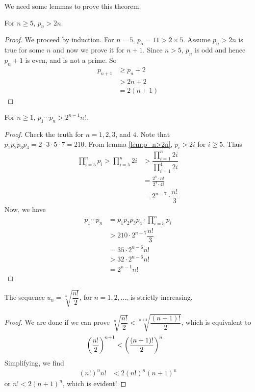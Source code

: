 \documentclass{subfiles}
\begin{document}
	We need some lemmas to prove this theorem.

	\begin{lemma}
		For $n\geq 5$, $p_n>2n$.\label{lem:p_n>2n}
	\end{lemma}

	\begin{proof}
		We proceed by induction. For $n=5$, $p_5=11>2 \times 5$. Assume $p_n >2n$ is true for some $n$ and now we prove it for $n+1$. Since $n>5$, $p_n$ is odd and hence $p_n+1$ is even, and is not a prime. So
			\begin{align*}
				p_{n+1}
					& \geq p_n+2\\
					& >2n+2\\
					& =2(n+1)
			\end{align*}
	\end{proof}

	\begin{lemma}
		For $n\geq1$, $p_1\cdots p_n> 2^{n-1}n!$.\label{lem:p_1p_2...p_n>2^{n-1}n!}
	\end{lemma}

	\begin{proof}
		Check the truth for $n=1,2,3$, and $4$. Note that $p_1p_2p_3p_4=2\cdot3\cdot5\cdot7=210$. From lemma \eqref{lem:p_n>2n}, $p_i>2i$ for $i\geq5$. Thus
			\begin{align*}
				\prod_{i=5}^np_i > \prod_{i=5}^n2i & > \dfrac{\prod_{i=1}^n 2i}{\prod_{i=1}^4 2i}\\
												   & = \frac{2^n \cdot n!}{2^4\cdot 4!}\\
												   & = 2^{n-7}\cdot \dfrac{n!}{3}
			\end{align*}
		Now, we have
			\begin{align*}
				p_1\cdots p_n & = p_1p_2p_3p_4\cdot \prod_{i=5}^np_i \\
						   	  & > 210\cdot2^{n-7}\dfrac{n!}{3}\\
							  & = 35 \cdot2^{n-6}n!\\
							  & > 32 \cdot 2^{n-6}n!\\
							  & = 2^{n-1}n!
			\end{align*}
	\end{proof}

	\begin{lemma}
		The sequence $u_n=\sqrt[n]{\dfrac{n!}{2}}$, for $n=1,2,\ldots$, is strictly increasing.\label{lem:n!/2}
	\end{lemma}

	\begin{proof}
		We are done if we can prove $\sqrt[n]{\dfrac{n!}{2}}<\sqrt[n+1]{\dfrac{(n+1)!}{2}}$, which is equivalent to
			\begin{align*}
				\func{}{\dfrac{n!}{2}}^{n+1}
					& < \func{}{\dfrac{(n+1)!}{2}}^n
			\end{align*}
		Simplifying, we find
			\begin{align*}
				 (n!)^n n!
				 	& <  2(n!)^n(n+1)^n
			\end{align*}
		or $n!  <  2(n+1)^n$, which is evident!
	\end{proof}
\end{document}
